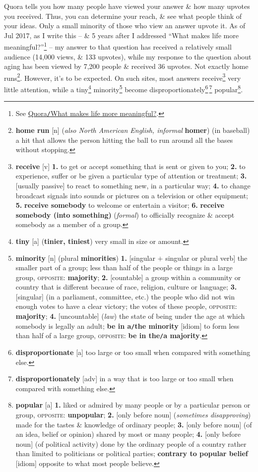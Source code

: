 \documentclass[oneside]{book}
\numberwithin{equation}{section}
\begin{document}
Quora tells you how many people have viewed your answer \& how many upvotes you received. Thus, you can determine your reach, \& see what people think of your ideas. Only a small minority of those who view an answer upvote it. As of Jul 2017, as I write this -- \& 5 years after I addressed ``What makes life more meaningful?''\footnote{See \href{https://www.quora.com/What-makes-life-more-meaningful}{Quora\texttt{/}What makes life more meaningful?}.} -- my answer to that question has received a relatively small audience (14,000 views, \& 133 upvotes), while my response to the question about aging has been viewed by 7,200 people \& received 36 upvotes. Not exactly home runs\footnote{\textbf{home run} [n] (\textit{also North American English, informal} \textbf{homer}) (in baseball) a hit that allows the person hitting the ball to run around all the bases without stopping.}. However, it's to be expected. On such sites, most answers receive\footnote{\textbf{receive} [v] \textbf{1.} to get or accept something that is sent or given to you; \textbf{2.} to experience, suffer or be given a particular type of attention or treatment; \textbf{3.} [usually passive] to react to something new, in a particular way; \textbf{4.} to change broadcast signals into sounds or pictures on a television or other equipment; \textbf{5.} \textbf{receive somebody} to welcome or entertain a visitor; \textbf{6.} \textbf{receive somebody (into something)} (\textit{formal}) to officially recognize \& accept somebody as a member of a group.} very little attention, while a tiny\footnote{\textbf{tiny} [a] (\textbf{tinier, tiniest}) very small in size or amount.} minority\footnote{\textbf{minority} [n] (plural \textbf{minorities}) \textbf{1.} [singular $+$ singular or plural verb] the smaller part of a group; less than half of the people or things in a large group, \textsc{opposite}: \textbf{majority}; \textbf{2.} [countable] a group within a community or country that is different because of race, religion, culture or language; \textbf{3.} [singular] (in a parliament, committee, etc.) the people who did not win enough votes to have a clear victory; the votes of these people, \textsc{opposite}: \textbf{majority}; \textbf{4.} [uncountable] (\textit{law}) the state of being under the age at which somebody is legally an adult; \textbf{be in a\texttt{/}the minority} [idiom] to form less than half of a large group, \textsc{opposite}: \textbf{be in the\texttt{/}a majority}.} become disproportionately\footnote{\textbf{disproportionate} [a] too large or too small when compared with something else.}\,\footnote{\textbf{disproportionately} [adv] in a way that is too large or too small when compared with something else.} popular\footnote{\textbf{popular} [a] \textbf{1.} liked or admired by many people or by a particular person or group, \textsc{opposite}: \textbf{unpopular}; \textbf{2.} [only before noun] (\textit{sometimes disapproving}) made for the tastes \& knowledge of ordinary people; \textbf{3.} [only before noun] (of an idea, belief or opinion) shared by most or many people; \textbf{4.} [only before noun] (of political activity) done by the ordinary people of a country rather than limited to politicians or political parties; \textbf{contrary to popular belief} [idiom] opposite to what most people believe.}.
\end{document}
